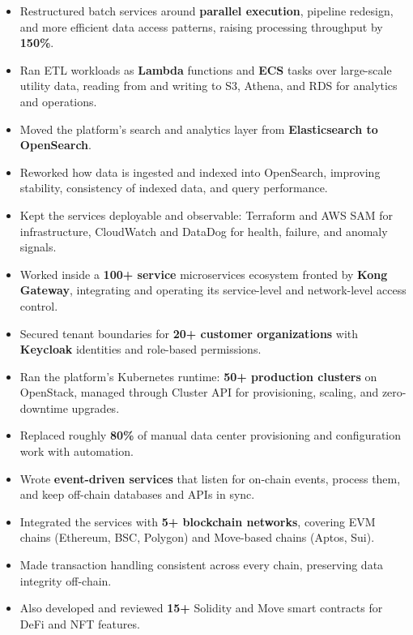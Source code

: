 \begin{itemize}
    \item Restructured batch services around \textbf{parallel execution}, pipeline redesign, and more efficient data access patterns, raising processing throughput by \textbf{150\%}. %
    \item Ran ETL workloads as \textbf{Lambda} functions and \textbf{ECS} tasks over large-scale utility data, reading from and writing to S3, Athena, and RDS for analytics and operations. %
    \item Moved the platform's search and analytics layer from \textbf{Elasticsearch to OpenSearch}. %
    \item Reworked how data is ingested and indexed into OpenSearch, improving stability, consistency of indexed data, and query performance. %
    \item Kept the services deployable and observable: Terraform and AWS SAM for infrastructure, CloudWatch and DataDog for health, failure, and anomaly signals. %
\end{itemize}

\jobVNPAY
\begin{itemize}
    \item Worked inside a \textbf{100+ service} microservices ecosystem fronted by \textbf{Kong Gateway}, integrating and operating its service-level and network-level access control. %
    \item Secured tenant boundaries for \textbf{20+ customer organizations} with \textbf{Keycloak} identities and role-based permissions. %
    \item Ran the platform's Kubernetes runtime: \textbf{50+ production clusters} on OpenStack, managed through Cluster API for provisioning, scaling, and zero-downtime upgrades. %
    \item Replaced roughly \textbf{80\%} of manual data center provisioning and configuration work with automation. %
\end{itemize}

\jobEsolLabs
\begin{itemize}
    \item Wrote \textbf{event-driven services} that listen for on-chain events, process them, and keep off-chain databases and APIs in sync. %
    \item Integrated the services with \textbf{5+ blockchain networks}, covering EVM chains (Ethereum, BSC, Polygon) and Move-based chains (Aptos, Sui). %
    \item Made transaction handling consistent across every chain, preserving data integrity off-chain. %
    \item Also developed and reviewed \textbf{15+} Solidity and Move smart contracts for DeFi and NFT features. %
\end{itemize}

